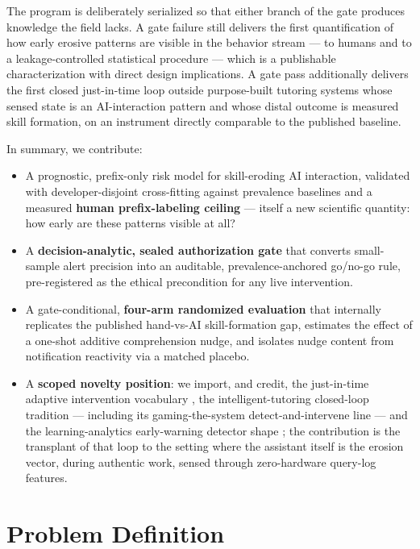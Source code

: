 \documentclass[11pt]{article}
\begin{document}
The program is deliberately serialized so that either branch of the gate produces knowledge the field lacks. A gate failure still delivers the first quantification of how early erosive patterns are visible in the behavior stream --- to humans and to a leakage-controlled statistical procedure --- which is a publishable characterization with direct design implications. A gate pass additionally delivers the first closed just-in-time loop outside purpose-built tutoring systems whose sensed state is an AI-interaction pattern and whose distal outcome is measured skill formation, on an instrument directly comparable to the published baseline.

In summary, we contribute:
\begin{itemize}
  \item A prognostic, prefix-only risk model for skill-eroding AI interaction, validated with developer-disjoint cross-fitting against prevalence baselines and a measured \textbf{human prefix-labeling ceiling} --- itself a new scientific quantity: how early are these patterns visible at all?
  \item A \textbf{decision-analytic, sealed authorization gate} that converts small-sample alert precision into an auditable, prevalence-anchored go/no-go rule, pre-registered as the ethical precondition for any live intervention.
  \item A gate-conditional, \textbf{four-arm randomized evaluation} that internally replicates the published hand-vs-AI skill-formation gap, estimates the effect of a one-shot additive comprehension nudge, and isolates nudge content from notification reactivity via a matched placebo.
  \item A \textbf{scoped novelty position}: we import, and credit, the just-in-time adaptive intervention vocabulary \citep{nahumshani2018jitai}, the intelligent-tutoring closed-loop tradition \citep{corbett1995knowledge} --- including its gaming-the-system detect-and-intervene line --- and the learning-analytics early-warning detector shape \citep{gardner2018mooc}; the contribution is the transplant of that loop to the setting where the assistant itself is the erosion vector, during authentic work, sensed through zero-hardware query-log features.
\end{itemize}

\section{Problem Definition}
\label{sec:problem}
\end{document}
